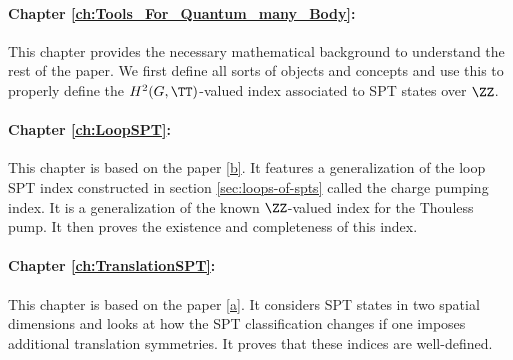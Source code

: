 \paragraph{Chapter \ref{ch:Tools_For_Quantum_many_Body}:}This chapter provides the necessary mathematical background to understand the rest of the paper. We first define all sorts of objects and concepts and use this to properly define the $H^2(G,\TT)$-valued index associated to SPT states over $\ZZ$.
\paragraph{Chapter \ref{ch:LoopSPT}:}This chapter is based on the paper \hyperref[mySecondPaper]{[b]}. It features a generalization of the loop SPT index constructed in section \ref{sec:loops-of-spts} called the charge pumping index. It is a generalization of the known $\ZZ$-valued index for the Thouless pump. It then proves the existence and completeness of this index.
\paragraph{Chapter \ref{ch:TranslationSPT}:}This chapter is based on the paper \hyperref[myFirstPaper]{[a]}. It considers SPT states in two spatial dimensions and looks at how the SPT classification changes if one imposes additional translation symmetries. It proves that these indices are well-defined.

\cleardoublepage

